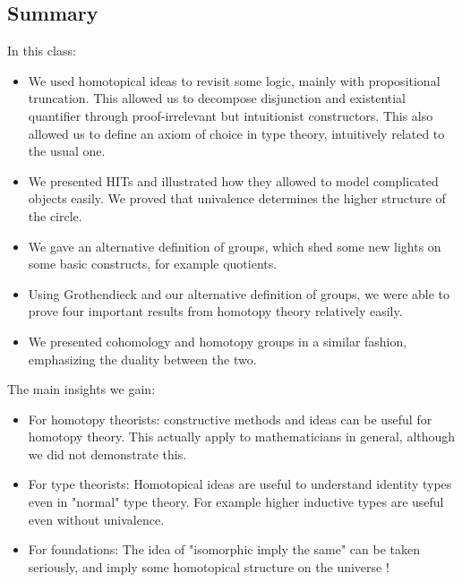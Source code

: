 \documentclass{article}
\newcommand{\sse}[1]{\medbreak \subsection{#1}}
\begin{document}
\sse{Summary}
In this class:
\begin{itemize}
\item We used homotopical ideas to revisit some logic, mainly with propositional truncation. This allowed us to decompose disjunction and existential quantifier through proof-irrelevant but intuitionist constructors. This also allowed us to define an axiom of choice in type theory, intuitively related to the usual one.
\item We presented HITs and illustrated how they allowed to model complicated objects easily. We proved that univalence determines the higher structure of the circle.
\item We gave an alternative definition of groups, which shed some new lights on some basic constructs, for example quotients.
\item Using Grothendieck and our alternative definition of groups, we were able to prove four important results from homotopy theory relatively easily. %
\item We presented cohomology and homotopy groups in a similar fashion, emphasizing the duality between the two.
\end{itemize}

\noindent The main insights we gain:
\begin{itemize}
\item For homotopy theorists: constructive methods and ideas can be useful for homotopy theory. This actually apply to mathematicians in general, although we did not demonstrate this.
\item For type theorists: Homotopical ideas are useful to understand identity types even in "normal" type theory. For example higher inductive types are useful even without univalence. 
\item For foundations: The idea of "isomorphic imply the same" can be taken seriously, and imply some homotopical structure on the universe !
\end{itemize}
\end{document}

